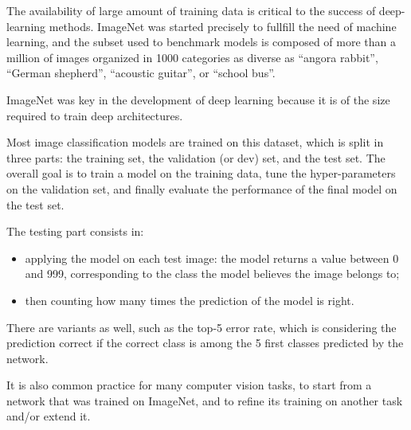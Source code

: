 \documentclass[c,8pt]{beamer}
\begin{document}
\begin{frame}{}{}
{  The availability of large amount of training data is critical to the
  success of deep-learning methods. ImageNet was started precisely to
  fullfill the need of machine learning, and the subset used to
  benchmark models is composed of more than a million of images
  organized in 1000 categories as diverse as ``angora rabbit'',
  ``German shepherd'', ``acoustic guitar'', or ``school bus''.

  ImageNet was key in the development of deep learning because it
  is of the size required to train deep architectures.

  Most image classification models are trained on this dataset, which
  is split in three parts: the training set, the validation (or dev)
  set, and the test set. The overall goal is to train a model on the
  training data, tune the hyper-parameters on the validation set, and
  finally evaluate the performance of the final model on the test set.

  The testing part consists in:
  \begin{itemize}
  \item applying the model on each test image: the model returns a
  value between 0 and 999, corresponding to the class the model
  believes the image belongs to;
  \item then counting how many times the prediction of the model is
  right.
  \end{itemize}

  There are variants as well, such as the top-5 error rate, which is
  considering the prediction correct if the correct class is among the
  5 first classes predicted by the network.

  It is also common practice for many computer vision tasks, to start
  from a network that was trained on ImageNet, and to refine its
  training on another task and/or extend it.

}

\end{frame}

\end{document}
